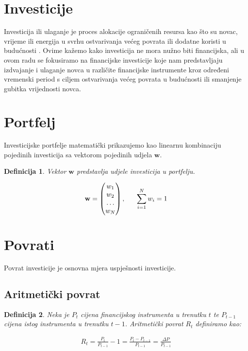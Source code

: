 \documentclass[zavrsnirad, upload]{fer}
\newtheorem{definition}{Definicija}
\begin{document}
\section{Investicije}
\label{sek:investicije}
Investicija ili ulaganje je proces alokacije ograničenih resursa
kao što su novac, vrijeme ili energija u svrhu ostvarivanja
većeg povrata ili dodatne koristi u budućnosti \cite{Investments}.
Ovime kažemo kako investicija ne mora nužno biti financijska,
ali u ovom radu se fokusiramo na financijske investicije koje nam
predstavljaju izdvajanje i ulaganje novca u različite financijske instrumente
kroz određeni vremenski period s ciljem ostvarivanja većeg povrata
u budućnosti ili smanjenje gubitka vrijednosti novca.

\section{Portfelj}
\label{sek:portfelj}
Investicijske portfelje matematički prikazujemo kao linearnu kombinaciju
pojedinih investicija sa vektorom pojedinih udjela $\mathbf{w}$.
\begin{definition}
	Vektor $\mathbf{w}$ predstavlja udjele investicija u portfelju.
\end{definition}
\begin{align}
	\mathbf{w} = \begin{pmatrix} w_1 \\ w_2 \\ \dots \\ w_N \end{pmatrix},
	\indent \sum_{i = 1}^{N} w_i = 1
\end{align}

\section{Povrati}
\label{sek:povrati}
Povrat investicije je osnovna mjera uspješnosti investicije.
\subsection{Aritmetički povrat}

\begin{definition}
	Neka je $P_t$ cijena financijskog instrumenta u trenutku $t$ te
    $P_{t-1}$ cijena istog instrumenta u trenutku $t-1$. Aritmetički povrat
    $R_t$ definiramo kao:
\end{definition}
\begin{align}R_t = \frac{P_t}{P_{t-1}} - 1 =
    \frac{P_t - P_{t-1}}{P_{t-1}} =
\frac{\Delta P}{P_{t-1}}
\end{align}
\end{document}
